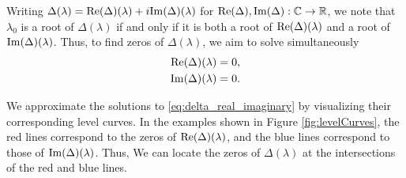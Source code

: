\documentclass[12pt, oneside, a4paper]{article}
\begin{document}
Writing $\Delta(\lambda)=\mathrm{Re}(\Delta)(\lambda) + i\mathrm{Im}(\Delta)(\lambda)$ for $\mathrm{Re}(\Delta), \mathrm{Im}(\Delta): \mathbb C\to\mathbb R$, we note that $\lambda_0$ is a root of $\Delta(\lambda)$ if and only if it is both a root of $\mathrm{Re}(\Delta)(\lambda)$ and a root of $\mathrm{Im}(\Delta)(\lambda)$. Thus, to find zeros of $\Delta(\lambda)$, we aim to solve simultaneously
\begin{subequations}\label{eq:delta_real_imaginary}
    \begin{align}
        \mathrm{Re}(\Delta)(\lambda) &= 0,\\
        \mathrm{Im}(\Delta)(\lambda) &= 0.
    \end{align}
\end{subequations}


We approximate the solutions to \eqref{eq:delta_real_imaginary} by visualizing their corresponding level curves. In the examples shown in Figure \ref{fig:levelCurves}, the red lines correspond to the zeros of $\mathrm{Re}(\Delta)(\lambda)$, and the blue lines correspond to those of $\mathrm{Im}(\Delta)(\lambda)$. Thus, We can locate the zeros of $\Delta(\lambda)$ at the intersections of the red and blue lines. 
\end{document}
